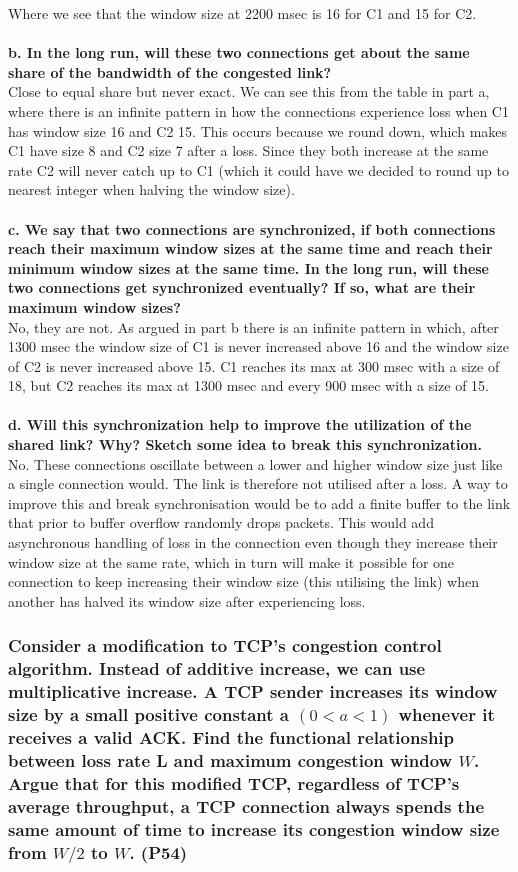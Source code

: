 Where we see that the window size at 2200 msec is 16 for C1 and 15 for C2. \\
\\
\textbf{b. In the long run, will these two connections get about the same share of the bandwidth of the congested link?} \\
Close to equal share but never exact. We can see this from the table in part a, where there is an infinite pattern in how the connections experience loss when C1 has window size 16 and C2 15. This occurs because we round down, which makes C1 have size 8 and C2 size 7 after a loss. Since they both increase at the same rate C2 will never catch up to C1 (which it could have we decided to round up to nearest integer when halving the window size). \\
\\
\textbf{c. We say that two connections are synchronized, if both connections reach their maximum window sizes at the same time and reach their minimum window sizes at the same time. In the long run, will these two connections get synchronized eventually? If so, what are their maximum window sizes?} \\
No, they are not. As argued in part b there is an infinite pattern in which, after 1300 msec the window size of C1 is never increased above 16 and the window size of C2 is never increased above 15. C1 reaches its max at 300 msec with a size of 18, but C2 reaches its max at 1300 msec and every 900 msec with a size of 15.\\
\\
\textbf{d. Will this synchronization help to improve the utilization of the shared link? Why? Sketch some idea to break this synchronization.} \\
No. These connections oscillate between a lower and higher window size just like a single connection would. The link is therefore not utilised after a loss. A way to improve this and break synchronisation would be to add a finite buffer to the link that prior to buffer overflow randomly drops packets. This would add asynchronous handling of loss in the connection even though they increase their window size at the same rate, which in turn will make it possible for one connection to keep increasing their window size (this utilising the link) when another has halved its window size after experiencing loss.


\subsubsection{Consider a modification to TCP's congestion control algorithm. Instead of additive increase, we can use multiplicative increase. A TCP sender increases its window size by a small positive constant a $(0 < a < 1)$ whenever it receives a valid ACK. Find the functional relationship between loss rate L and maximum congestion window $W$. Argue that for this modified TCP, regardless of TCP's average throughput, a TCP connection always spends the same amount of time to increase its congestion window size from $W/2$ to $W$. (P54)}



